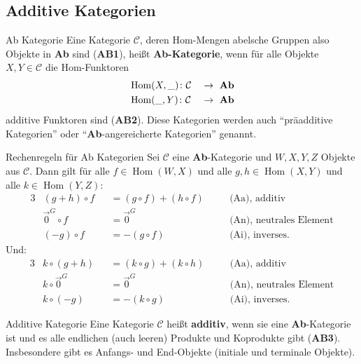 \documentclass[a4paper]{amsart}
\theoremstyle{definition}
\DeclareMathOperator{\Hom}{Hom}
\newcommand{\CC}{\ensuremath{\mathcal{ C }}}
\begin{document}
\subsection{Additive Kategorien}
\begin{Definition}{Ab Kategorie}
   Eine Kategorie $\CC$, deren Hom-Mengen abelsche Gruppen also Objekte in \textbf{Ab} sind (\textbf{AB1}), heißt \textbf{Ab-Kategorie}, wenn für alle Objekte $X, Y \in \CC$ die Hom-Funktoren
   \begin{alignat}{2}
      &\Hom( X, \_ ) \colon \CC &&\to \text{ \textbf{Ab}}\\
      &\Hom( \_, Y ) \colon \CC &&\to \text{ \textbf{Ab}}
   \end{alignat}
   additive Funktoren sind (\textbf{AB2}). Diese Kategorien werden auch "`präadditive Kategorien"' oder "`\textbf{Ab}-angereicherte Kategorien"' genannt.
\end{Definition} 

\begin{Satz}{Rechenregeln für Ab Kategorien}
   Sei $\CC$ eine \textbf{Ab}-Kategorie und $W,X,Y,Z$ Objekte aus $\CC$. Dann gilt für alle $f \in \Hom( W, X )$ und alle $g, h \in \Hom( X, Y )$ und alle $k \in \Hom( Y, Z )$:
   \begin{alignat}{3}
      &(g+h) \circ f &&= (g \circ f) + (h \circ f) && \quad \text{(Aa), additiv}\\
      &\vec{0}^G \circ f     &&= \vec{0}^G         && \quad \text{(An), neutrales Element}\\
      &(-g) \circ f  &&= -(g \circ f)              && \quad \text{(Ai), inverses}.
   \end{alignat}
   Und:
   \begin{alignat}{3}
      &k \circ (g+h) &&= (k \circ g) + (k \circ h) && \quad \text{(Aa), additiv}\\
      &k \circ \vec{0}^G     &&= \vec{0}^G         && \quad \text{(An), neutrales Element}\\
      &k \circ (-g)  &&= -(k \circ g)              && \quad \text{(Ai), inverses}.
   \end{alignat}
\end{Satz}

\begin{Definition}{Additive Kategorie}
   Eine Kategorie $\CC$ heißt \textbf{additiv}, wenn sie eine \textbf{Ab}-Kategorie ist und es alle endlichen (auch leeren) Produkte und Koprodukte gibt (\textbf{AB3}). Insbesondere gibt es Anfangs- und End-Objekte (initiale und terminale Objekte).
\end{Definition} 
\end{document}
